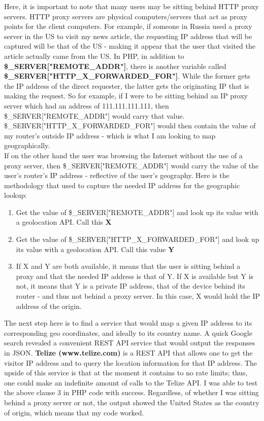 \documentclass[12pt]{article}
\begin{document}
Here, it is important to note that many users may be sitting behind HTTP proxy servers. HTTP proxy servers are physical computers/servers that act as proxy points for the client computers. For example, if someone in Russia used a proxy server in the US to visit my news article, the requesting IP address that will be captured will be that of the US - making it appear that the user that visited the article actually came from the US. In PHP, in addition to \textbf{\$\_SERVER["REMOTE\_ADDR"]}, there is another variable called \textbf{\$\_SERVER["HTTP\_X\_FORWARDED\_FOR"]}. While the former gets the IP address of the direct requester, the latter gets the originating IP that is making the request. So for example, if I were to be sitting behind an IP proxy server which had an address of 111.111.111.111, then \$\_SERVER["REMOTE\_ADDR"] would carry that value. \\
\$\_SERVER["HTTP\_X\_FORWARDED\_FOR"] would then contain the value of my router's outside IP address - which is what I am looking to map geographically.   
\\ If on the other hand the user was browsing the Internet without the use of a proxy server, then \$\_SERVER["REMOTE\_ADDR"] would carry the value of the user's router's IP address - reflective of the user's geography. 
Here is the methodology that used to capture the needed IP address for the geographic lookup:
\begin{enumerate}
\item Get the value of \$\_SERVER["REMOTE\_ADDR"] and look up its value with a geolocation API. Call this \textbf{X}
\item Get the value of \$\_SERVER["HTTP\_X\_FORWARDED\_FOR"] and look up its value with a geolocation API. Call this value \textbf{Y}
\item If X and Y are both available, it means that the user is sitting behind a proxy and that the needed IP address is that of Y. If X is available but Y is not, it means that Y is a private IP address, that of the device behind its router - and thus not behind a proxy server. In this case, X would hold the IP address of the origin.
\end{enumerate} 

The next step here is to find a service that would map a given IP address to its corresponding geo coordinates, and ideally to its country name. A quick Google search revealed a convenient REST API service that would output the responses in JSON. \textbf{Telize (www.telize.com)} is a REST API that allows one to get the visitor IP address and to query the location information for that IP address. The upside of this service is that at the moment it contains to no rate limits; thus, one could make an indefinite amount of calls to the Telize API. I was able to test the above clause 3 in PHP code with success. Regardless, of whether I was sitting behind a proxy server or not, the output showed the United States as the country of origin, which means that my code worked.
\end{document}
